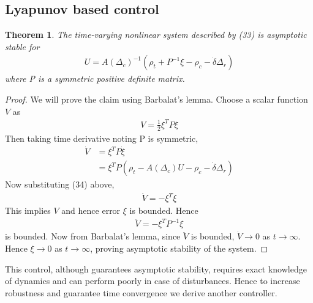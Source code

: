 \documentclass[]{article}
\newtheorem{theorem}{Theorem}
\theoremstyle{remark}
\theoremstyle{definition}
\begin{document}
	\subsection{Lyapunov based control}
	\begin{theorem}
	The time-varying nonlinear system described by (33) is asymptotic stable for \begin{align}
		U = A(\Delta_c)^{-1}(\rho_t + {P^{-1}}\xi - \rho_c-\dot\delta\Delta_r)
	\end{align}  where P is a symmetric positive definite matrix.	
	\end{theorem} 
\begin{proof}
 We will prove the claim using Barbalat's lemma.  Choose a scalar function $V$ as
\begin{align}
	V = \frac{1}{2}\xi^T{P}\xi
\end{align}
Then taking time derivative noting P is symmetric,
\begin{align}
	\dot V &= \xi^T{P}\dot\xi \\
	& = \xi^T{P}(\rho_t -  A(\Delta_c)U-\rho_c - \dot \delta \Delta_r)
\end{align}
Now substituting (34) above,
\begin{align}
	\dot V = -\xi^T\xi
\end{align}
This implies $V$ and hence error $\xi$ is bounded.
Hence \begin{align}
	\ddot V = -\xi^T{P^{-1}}\xi
\end{align}
is bounded. 
Now from Barbalat's lemma, since $\ddot V$ is bounded, $\dot V \to 0$ as $t\to \infty$. Hence $\xi \to 0$ as $t\to \infty$, proving asymptotic stability of the system.

\end{proof}
This control, although guarantees asymptotic stability, requires exact knowledge of dynamics and can perform poorly in case of disturbances. Hence to increase robustness and guarantee time convergence we derive another controller.
\end{document}
